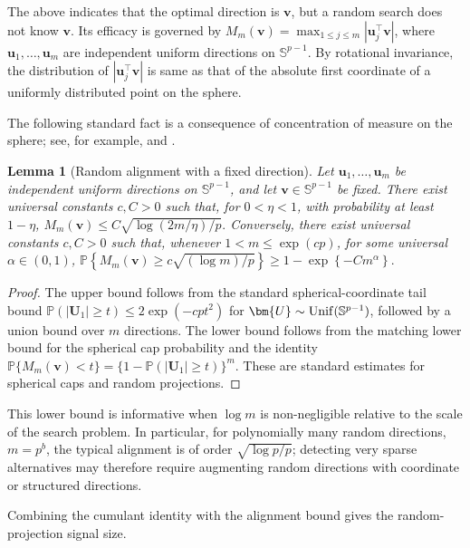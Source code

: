 \documentclass[11pt]{article}
\theoremstyle{plain}
\newtheorem{lemma}{Lemma}
\theoremstyle{definition}
\theoremstyle{remark}
\def\u{\bm{u}}
\def\v{\bm{v}}
\newcommand{\Prob}{\mathbb{P}}
\begin{document}
The above indicates that the optimal direction is \(\v\), but a random search does not know \(\v\). Its efficacy is governed by \(M_m(\v)=\max_{1\leqslant j\leqslant m}|\u_j^\top \v|\), where \(\u_1,\ldots,\u_m\) are independent uniform directions on \(\mathbb{S}^{p-1}\). By rotational invariance, the distribution of \(|\u_j^\top \v|\) is same as that of the absolute first coordinate of a uniformly distributed point on the sphere. 

The following standard fact is a consequence of concentration of measure on the sphere; see, for example, \citet{ledoux2001concentration} and \citet[Chapter~3]{vershynin2018highdimensional}.

\begin{lemma}[Random alignment with a fixed direction]
	\label{lem:random_alignment_order}
	Let \(\u_1,\ldots,\u_m\) be independent uniform directions on \(\mathbb{S}^{p-1}\), and let \(\v\in \mathbb{S}^{p-1}\) be fixed. There exist universal constants \(c,C>0\) such that, for \(0<\eta<1\), with probability at least \(1-\eta\),
	\(M_m(\v)\leqslant C\sqrt{\log(2m/\eta)/p}.\)
	Conversely, there exist universal constants \(c,C>0\) such that, whenever
	\(1<m\leqslant \exp(cp)\), for some universal \(\alpha\in(0,1)\),
	\(
	\Prob\left\{
	M_m(\v)\geqslant c\sqrt{(\log m)/p}
	\right\}
	\geqslant 1-\exp\left\{-C m^{\alpha}\right\}.
	\)
\end{lemma}

\begin{proof}
	The upper bound follows from the standard spherical-coordinate tail bound \(\Prob(|\bm{U}_1|\geqslant t)\leqslant 2\exp(-cpt^2)\) for \(\bm{U}\sim{\rm Unif}(\mathbb{S}^{p-1})\), followed by a union bound over \(m\) directions. The lower bound follows from the matching lower bound for the spherical cap probability and the identity \(\Prob\{M_m(\v)<t\}=\{1-\Prob(|\bm{U}_1|\geqslant t)\}^m\). These are standard estimates for spherical caps and random projections.
\end{proof}

This lower bound is informative when \(\log m\) is non-negligible relative to the scale of the search problem. In particular, for polynomially many random directions, \(m=p^b\), the typical alignment is of order \(\sqrt{\log p/p}\); detecting very sparse alternatives may therefore require augmenting random directions with coordinate or structured directions.

Combining the cumulant identity with the alignment bound gives the random-projection signal size.
\end{document}
